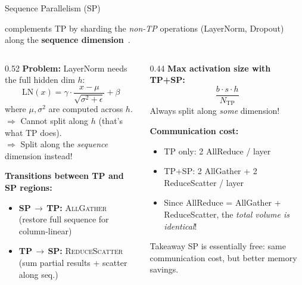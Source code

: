 \begin{frame}{Sequence Parallelism (SP)}

   complements TP by sharding the \emph{non-TP} operations (LayerNorm, Dropout) along the \textbf{sequence dimension}~\cite{korthikanti2023selective}.

  \vspace{0.3em}
  \begin{columns}
    \begin{column}{0.52\textwidth}
      \textbf{Problem:} LayerNorm needs the full hidden dim $h$:
      \[
        \text{LN}(x) = \gamma \cdot \frac{x - \mu}{\sqrt{\sigma^2 + \epsilon}} + \beta
      \]
      where $\mu, \sigma^2$ are computed across $h$. \\[0.2em]
      $\Rightarrow$ Cannot split along $h$ (that's what TP does). \\[0.2em]
      $\Rightarrow$ Split along the \emph{sequence} dimension instead!

      \vspace{0.3em}
      \textbf{Transitions between TP and SP regions:}
      \begin{itemize}
        \item \textbf{SP\,$\to$\,TP:} \textsc{AllGather} (restore full sequence for column-linear)
        \item \textbf{TP\,$\to$\,SP:} \textsc{ReduceScatter} (sum partial results + scatter along seq.)
      \end{itemize}
    \end{column}
    \begin{column}{0.44\textwidth}
      \textbf{Max activation size with TP+SP:}
      \[
        \frac{b \cdot s \cdot h}{N_{\text{TP}}}
      \]
      Always split along \emph{some} dimension!

      \vspace{0.5em}
      \textbf{Communication cost:}\\[0.2em]
      {\small
      \begin{itemize}
        \item TP only: 2 AllReduce / layer
        \item TP+SP: 2 AllGather + 2 ReduceScatter / layer
        \item Since AllReduce = AllGather + ReduceScatter, the \emph{total volume is identical}!
      \end{itemize}
      }

      \vspace{0.3em}
      \begin{alertblock}{Takeaway}
        SP is essentially free: same communication cost, but better memory savings.
      \end{alertblock}
    \end{column}
  \end{columns}
\end{frame}

